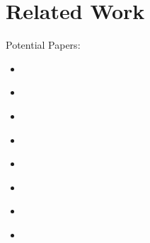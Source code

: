 \chapter{Related Work}\label{ch:rw}

Potential Papers:
\begin{itemize}
	\item \citet{Adner2006}
	\item \citet{Grasl2009}
	\item \citet{Porter2008}
	\item \citet{Cusumano2002}
	\item \citet{Cusumano2010}
	\item \citet{Drucker1994}
	\item \citet{Chesbrough2007}
	\item \citet{Tiwana2010}
\end{itemize}
